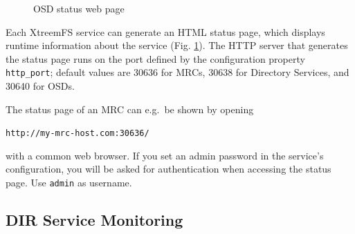 \documentclass[a4paper,10pt]{book}
\begin{document}
\begin{figure}[h]
 \centering
 \caption{OSD status web page}
 \label{fig:screenshot_status}
\end{figure}

Each XtreemFS service can generate an HTML status page, which displays runtime information about the service (Fig. \ref{fig:screenshot_status}). The HTTP server that generates the status page runs on the port defined by the configuration property \texttt{http\_port}; default values are 30636 for MRCs, 30638 for Directory Services, and 30640 for OSDs.

The status page of an MRC can e.g.\ be shown by opening

\texttt{http://my-mrc-host.com:30636/}

with a common web browser. If you set an admin password in the service's configuration, you will be asked for authentication when accessing the status page. Use \texttt{admin} as username.

\subsection{DIR Service Monitoring}
\end{document}
